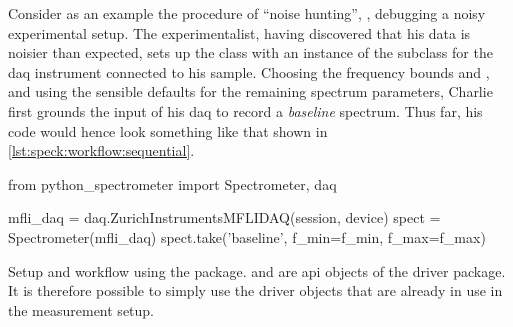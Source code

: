Consider as an example the procedure of \enquote{noise hunting}, \ie, debugging a noisy experimental setup.
The experimentalist,
having discovered that his data is noisier than expected, sets up the  class with an instance of the  subclass for the \gls{daq} instrument connected to his sample.
Choosing the frequency bounds \fmin and \fmax, and using the sensible defaults for the remaining spectrum parameters, Charlie first grounds the input of his \gls{daq} to record a \emph{baseline} spectrum.
Thus far, his code would hence look something like that shown in \cref{lst:speck:workflow:sequential}.

\begin{listing}
    \begin{py}
        from python_spectrometer import Spectrometer, daq

        mfli_daq = daq.ZurichInstrumentsMFLIDAQ(session, device)
        spect = Spectrometer(mfli_daq)
        spect.take('baseline', f_min=f_min, f_max=f_max)
    \end{py}
    \caption[\pyspeck workflow]{
        Setup and workflow using the \pyspeck package.
         and  are \gls{api} objects of the  driver package.
        It is therefore possible to simply use the driver objects that are already in use in the measurement setup.
    }
    \label{lst:speck:workflow:sequential}
\end{listing}


